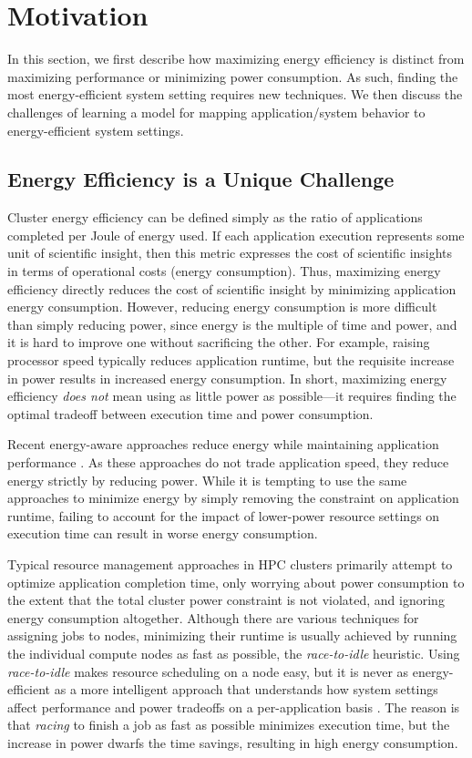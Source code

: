 \section{Motivation}
\label{sec:classifiers-motivation}

In this section, we first describe how maximizing energy efficiency is distinct from maximizing performance or minimizing power consumption.
As such, finding the most energy-efficient system setting requires new techniques.
We then discuss the challenges of learning a model for mapping application/system behavior to energy-efficient system settings.


\subsection{Energy Efficiency is a Unique Challenge}

Cluster energy efficiency can be defined simply as the ratio of applications completed per Joule of energy used.
If each application execution represents some unit of scientific insight, then this metric expresses the cost of scientific insights in terms of operational costs (energy consumption).
Thus, maximizing energy efficiency directly reduces the cost of scientific insight by minimizing application energy consumption.
However, reducing energy consumption is more difficult than simply reducing power, since energy is the multiple of time and power, and it is hard to improve one without sacrificing the other.
For example, raising processor speed typically reduces application runtime, but the requisite increase in power results in increased energy consumption.
In short, maximizing energy efficiency \emph{does not} mean using as little power as possible---it requires finding the optimal tradeoff between execution time and power consumption.

Recent energy-aware approaches reduce energy while maintaining application performance \cite{RountreeAdagio,Jitter,Marathe2015}.
As these approaches do not trade application speed, they reduce energy strictly by reducing power.
While it is tempting to use the same approaches to minimize energy by simply removing the constraint on application runtime, failing to account for the impact of lower-power resource settings on execution time can result in worse energy consumption.

Typical resource management approaches in HPC clusters primarily attempt to optimize application completion time, only worrying about power consumption to the extent that the total cluster power constraint is not violated, and ignoring energy consumption altogether.
Although there are various techniques for assigning jobs to nodes, minimizing their runtime is usually achieved by running the individual compute nodes as fast as possible, \ie the \emph{race-to-idle} heuristic.
Using \emph{race-to-idle} makes resource scheduling on a node easy, but it is never as energy-efficient as a more intelligent approach that understands how system settings affect performance and power tradeoffs on a per-application basis \cite{kim-cpsna2015}.
The reason is that \emph{racing} to finish a job as fast as possible minimizes execution time, but the increase in power dwarfs the time savings, resulting in high energy consumption.

